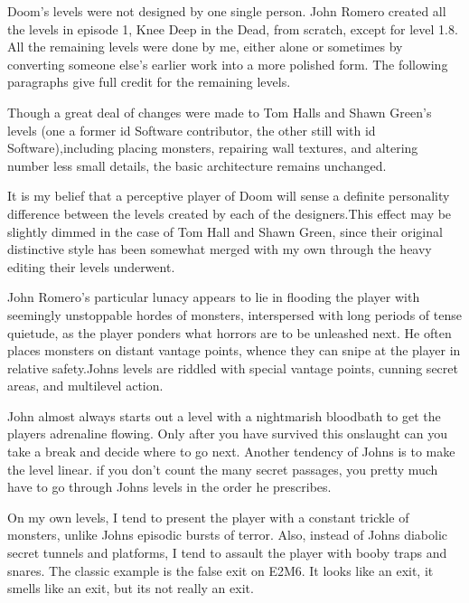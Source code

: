 Doom's levels were not designed by one single person. John Romero created all the levels in episode 1, Knee Deep in the Dead, from scratch, except for level 1.8. All the remaining levels were done by me, either alone or sometimes by converting someone else's earlier work into a more polished form. The following paragraphs give full credit for the remaining levels.\\
\par
 Though a great deal of changes were made to Tom Halls and Shawn Green's levels (one a former id Software contributor, the other still with id Software),including placing monsters, repairing wall textures, and altering number less small details, the basic architecture remains unchanged.\\
\par
It is my belief that a perceptive player of Doom will sense a definite personality difference between the levels created by each of the designers.This effect may be slightly dimmed in the case of Tom Hall and Shawn Green, since their original distinctive style has been somewhat merged with my own through the heavy editing their levels underwent.\\
\par
 John Romero's particular lunacy appears to lie in flooding the player with seemingly unstoppable hordes of monsters, interspersed with long periods of tense quietude, as the player ponders what horrors are to be unleashed next. He often places monsters on distant vantage points, whence they can snipe at the player in relative safety.Johns levels are riddled with special vantage points, cunning secret areas, and multilevel action.\\
 \par
  John almost always starts out a level with a nightmarish bloodbath to get the players adrenaline flowing. Only after you have survived this onslaught can you take a break and decide where to go next. Another tendency of Johns is to make the level linear. if you don't count the many secret passages, you pretty much have to go through Johns levels in the order he prescribes.\\
  \par
   On my own levels, I tend to present the player with a constant trickle of monsters, unlike Johns episodic bursts of terror. Also, instead of Johns diabolic secret tunnels and platforms, I tend to assault the player with booby traps and snares. The classic example is the false exit on E2M6. It looks like an exit, it smells like an exit, but its not really an exit.\\
